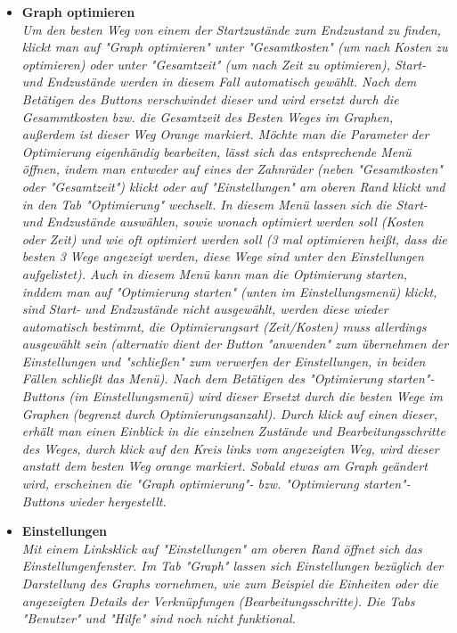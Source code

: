 \documentclass[twoside]{report}
\begin{document}
\begin{itemize}
{Mit einem Linksklick auf einen bereits erstellten Bearbeitungsschritt öffnet sich das "Bearbeitungsschritt bearbeiten"-Menü. Dieses ist aufgebaut wie das "Neuer Bearbeitungsschritt"-Menü. Hier können alle Eigenschaften des angeklickten Bearbeitungsschritt geändert werden. }
  \item \textbf{ Graph optimieren }
    \\\textit{
      Um den besten Weg von einem der Startzustände zum Endzustand zu finden, klickt man auf "Graph optimieren" unter "Gesamtkosten" (um nach Kosten zu optimieren) oder unter "Gesamtzeit" (um nach Zeit zu optimieren), Start- und Endzustände werden in diesem Fall automatisch gewählt. Nach dem Betätigen des Buttons verschwindet dieser und wird ersetzt durch die Gesammtkosten bzw. die Gesamtzeit des Besten Weges im Graphen, außerdem ist dieser Weg Orange markiert.
Möchte man die Parameter der Optimierung eigenhändig bearbeiten, lässt sich das entsprechende Menü öffnen, indem man entweder auf eines der Zahnräder (neben "Gesamtkosten" oder "Gesamtzeit") klickt oder auf "Einstellungen" am oberen Rand klickt und in den Tab "Optimierung" wechselt. In diesem Menü lassen sich die Start- und Endzustände auswählen, sowie wonach optimiert werden soll (Kosten oder Zeit) und wie oft optimiert werden soll (3 mal optimieren heißt, dass die besten 3 Wege angezeigt werden, diese Wege sind unter den Einstellungen aufgelistet). Auch in diesem Menü kann man die Optimierung starten, inddem man auf "Optimierung starten" (unten im Einstellungsmenü) klickt, sind Start- und Endzustände nicht ausgewählt, werden diese wieder automatisch bestimmt, die Optimierungsart (Zeit/Kosten) muss allerdings ausgewählt sein (alternativ dient der Button "anwenden" zum übernehmen der Einstellungen und "schließen" zum verwerfen der Einstellungen, in beiden Fällen schließt das Menü).
Nach dem Betätigen des "Optimierung starten"-Buttons (im Einstellungsmenü) wird dieser Ersetzt durch die besten Wege im Graphen (begrenzt durch Optimierungsanzahl). Durch klick auf einen dieser, erhält man einen Einblick in die einzelnen Zustände und Bearbeitungsschritte des Weges, durch klick auf den Kreis links vom angezeigten Weg, wird dieser anstatt dem besten Weg orange markiert.
Sobald etwas am Graph geändert wird, erscheinen die "Graph optimierung"- bzw. "Optimierung starten"-Buttons wieder hergestellt. }
  \item \textbf{ Einstellungen }
    \\\textit{
      Mit einem Linksklick auf "Einstellungen" am oberen Rand öffnet sich das Einstellungenfenster. Im Tab "Graph" lassen sich Einstellungen bezüglich der Darstellung des Graphs vornehmen, wie zum Beispiel die Einheiten oder die angezeigten Details der Verknüpfungen (Bearbeitungsschritte).  Die Tabs "Benutzer" und "Hilfe" sind noch nicht funktional. }

\end{itemize}
\end{document}
